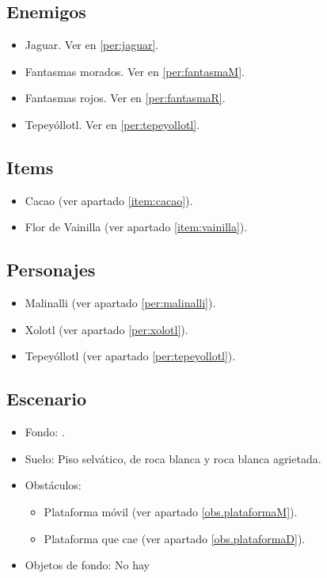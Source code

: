 	\subsection{Enemigos}
	\begin{itemize}
		\item Jaguar. Ver en \ref{per:jaguar}.
			
		\item Fantasmas morados. Ver en \ref{per:fantasmaM}.
		
		\item Fantasmas rojos. Ver en \ref{per:fantasmaR}.
			
		\item Tepeyóllotl. Ver en \ref{per:tepeyollotl}.
	\end{itemize}
	\subsection{Items}
	\begin{itemize}
        \item   Cacao (ver apartado \ref{item:cacao}).
        \item Flor de Vainilla (ver apartado \ref{item:vainilla}).
\end{itemize}
	\subsection{Personajes}
	\begin{itemize}
		\item Malinalli (ver apartado \ref{per:malinalli}).
		 
		\item Xolotl (ver apartado \ref{per:xolotl}).
	
		\item Tepeyóllotl (ver apartado \ref{per:tepeyollotl}).
	\end{itemize}
	\subsection{Escenario}
\begin{itemize} 
	\item Fondo: .
	\item Suelo: Piso selvático, de roca blanca y roca blanca agrietada.
	\item Obstáculos:
	\begin{itemize}
		\item Plataforma móvil (ver apartado \ref{obs.plataformaM}).
			\item Plataforma que cae (ver apartado \ref{obs.plataformaD}).
	\end{itemize}
	\item Objetos de fondo: No hay
\end{itemize}		

